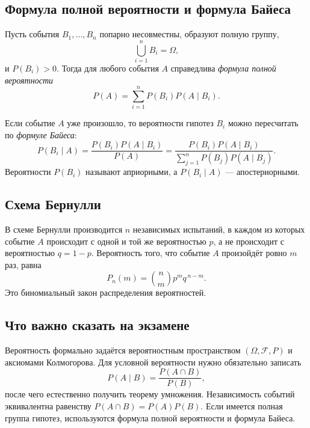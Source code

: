 \subsection{Формула полной вероятности и формула Байеса}

Пусть события $B_1,\ldots,B_n$ попарно несовместны, образуют полную группу,
\[
    \bigcup_{i=1}^{n}B_i=\Omega,
\]
и $P(B_i)>0$. Тогда для любого события $A$ справедлива \emph{формула полной
вероятности}
\[
    P(A)=\sum_{i=1}^{n}P(B_i)P(A\mid B_i).
\]

Если событие $A$ уже произошло, то вероятности гипотез $B_i$ можно пересчитать
по \emph{формуле Байеса}:
\[
    P(B_i\mid A)
    =\frac{P(B_i)P(A\mid B_i)}{P(A)}
    =\frac{P(B_i)P(A\mid B_i)}
    {\displaystyle\sum_{j=1}^{n}P(B_j)P(A\mid B_j)}.
\]
Вероятности $P(B_i)$ называют априорными, а $P(B_i\mid A)$ --- апостериорными.

\subsection{Схема Бернулли}

В схеме Бернулли производится $n$ независимых испытаний, в каждом из которых
событие $A$ происходит с одной и той же вероятностью $p$, а не происходит с
вероятностью $q=1-p$. Вероятность того, что событие $A$ произойдёт ровно $m$ раз,
равна
\[
    P_n(m)=\binom{n}{m}p^m q^{\,n-m}.
\]
Это биномиальный закон распределения вероятностей.

\subsection{Что важно сказать на экзамене}

Вероятность формально задаётся вероятностным пространством
$(\Omega,\mathcal F,P)$ и аксиомами Колмогорова. Для условной вероятности нужно
обязательно записать
\[
    P(A\mid B)=\frac{P(A\cap B)}{P(B)},
\]
после чего естественно получить теорему умножения. Независимость событий
эквивалентна равенству $P(A\cap B)=P(A)P(B)$. Если имеется полная группа гипотез,
используются формула полной вероятности и формула Байеса.

\newpage
